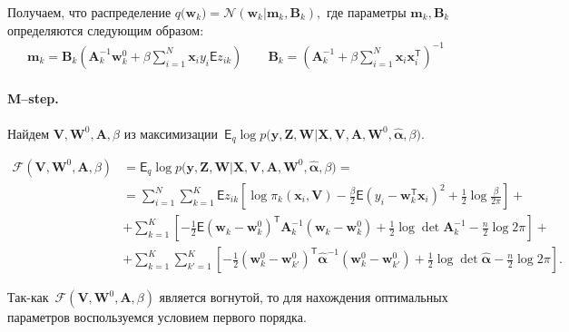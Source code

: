 \documentclass[12pt, twoside]{article}
\numberwithin{equation}{section}
\begin{document}
Получаем, что распределение $q\bigr(\mathbf{w}_{k}\bigr) = \mathcal{N}\left(\mathbf{w}_{k}| \mathbf{m}_{k}, \mathbf{B}_k\right),$ где параметры $\mathbf{m}_k, \mathbf{B}_k$ определяются следующим образом:
\begin{equation}
\label{eq:em:6}
\begin{aligned}
\mathbf{m}_{k} = \mathbf{B}_{k}\left(\mathbf{A}_{k}^{-1}\mathbf{w}_{k}^{0}+\beta\sum_{i=1}^{N}\mathbf{x}_{i}y_{i}\mathsf{E}z_{ik}\right) \qquad \mathbf{B}_{k} = \left(\mathbf{A}_{k}^{-1}+\beta\sum_{i=1}^{N}\mathbf{x}_{i}\mathbf{x}_{i}^{\mathsf{T}}\right)^{-1} 
\end{aligned}
\end{equation}

\paragraph{M--step.} Найдем $\mathbf{V}, \mathbf{W}^0, \textbf{A},  \beta$ из максимизации~$\mathsf{E}_{q}\log p\bigr(\mathbf{y}, \mathbf{Z}, \mathbf{W}|\mathbf{X}, \mathbf{V}, \textbf{A}, \textbf{W}^{0}, \hat{\bm{\alpha}}, \beta\bigr)$.

\begin{equation}
\label{eq:em:7}
\begin{aligned}
\mathcal{F}\left(\textbf{V}, \textbf{W}^{0}, \textbf{A}, \beta\right) &= \mathsf{E}_{q}\log p\bigr(\mathbf{y}, \mathbf{Z}, \mathbf{W}|\mathbf{X}, \mathbf{V}, \textbf{A}, \textbf{W}^{0}, \hat{\bm{\alpha}}, \beta\bigr) =  \\
&= \sum_{i=1}^{N}\sum_{k=1}^{K}\mathsf{E}z_{ik}\left[\log\pi_k\left(\textbf{x}_i, \textbf{V}\right) - \frac{\beta}{2}\mathsf{E}\left(y_{i} - \textbf{w}_{k}^{\mathsf{T}}\textbf{x}_{i}\right)^{2} + \frac{1}{2}\log\frac{\beta}{2\pi}\right] +\\
&+ \sum_{k=1}^{K}\left[-\frac{1}{2}\mathsf{E}\left(\textbf{w}_{k} - \textbf{w}_{k}^{0}\right)^{\mathsf{T}}\textbf{A}_{k}^{-1}\left(\textbf{w}_{k} - \textbf{w}_{k}^{0}\right) + \frac{1}{2}\log\det\textbf{A}^{-1}_{k} - \frac{n}{2}\log2\pi\right] +\\
&+ \sum_{k=1}^{K}\sum_{k'=1}^{K}\left[-\frac{1}{2}\left(\textbf{w}_{k}^{0}-\textbf{w}_{k'}^{0}\right)^{\mathsf{T}}\hat{\bm{\alpha}}^{-1}\left(\textbf{w}_{k}^{0}-\textbf{w}_{k'}^{0}\right) +\frac{1}{2}\log\det\hat{\bm{\alpha}} -\frac{n}{2}\log{2\pi}\right].
\end{aligned}
\end{equation}

Так-как~$\mathcal{F}\left(\textbf{V}, \textbf{W}^{0}, \textbf{A}, \beta\right)$ является вогнутой, то для нахождения оптимальных параметров воспользуемся условием первого порядка.
\end{document}
